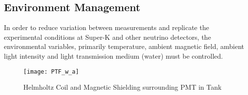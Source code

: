 \documentclass[journal]{IEEEtran}
\begin{document}
\subsection{Environment Management} 
In order to reduce variation between measurements and replicate the experimental conditions at Super-K and other neutrino detectors, the environmental variables, primarily temperature, ambient magnetic field, ambient light intensity and light transmission medium (water) must be controlled. 

\FloatBarrier

\begin{figure}[!htpb]
	\centering	
	\texttt{[image: PTF\_w\_a]}
	\caption{Helmholtz Coil and Magnetic Shielding surrounding PMT in Tank}
\end{figure}

\FloatBarrier
\end{document}
